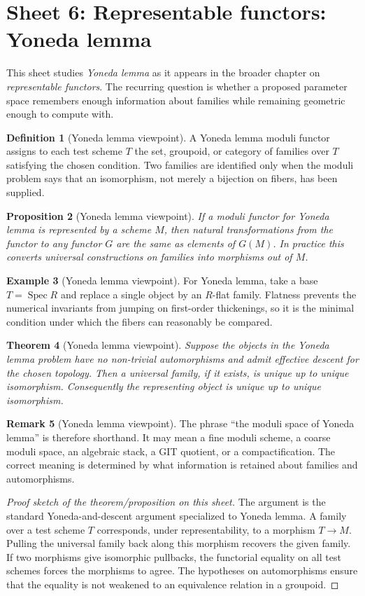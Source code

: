 \documentclass[11pt]{amsart}
\newtheorem{theorem}{Theorem}[section]
\newtheorem{proposition}[theorem]{Proposition}
\theoremstyle{definition}
\newtheorem{definition}[theorem]{Definition}
\newtheorem{example}[theorem]{Example}
\newtheorem{remark}[theorem]{Remark}
\newcommand{\Spec}{\operatorname{Spec}}
\begin{document}
\section{Sheet 6: Representable functors: Yoneda lemma}
This sheet studies \emph{Yoneda lemma} as it appears in the broader chapter on \emph{representable functors}.  The recurring question is whether a proposed parameter space remembers enough information about families while remaining geometric enough to compute with.
\begin{definition}[Yoneda lemma viewpoint]
A Yoneda lemma moduli functor assigns to each test scheme $T$ the set, groupoid, or category of families over $T$ satisfying the chosen condition.  Two families are identified only when the moduli problem says that an isomorphism, not merely a bijection on fibers, has been supplied.
\end{definition}
\begin{proposition}[Yoneda lemma viewpoint]
If a moduli functor for Yoneda lemma is represented by a scheme $M$, then natural transformations from the functor to any functor $G$ are the same as elements of $G(M)$.  In practice this converts universal constructions on families into morphisms out of $M$.
\end{proposition}
\begin{example}[Yoneda lemma viewpoint]
For Yoneda lemma, take a base $T=\Spec R$ and replace a single object by an $R$-flat family.  Flatness prevents the numerical invariants from jumping on first-order thickenings, so it is the minimal condition under which the fibers can reasonably be compared.
\end{example}
\begin{theorem}[Yoneda lemma viewpoint]
Suppose the objects in the Yoneda lemma problem have no non-trivial automorphisms and admit effective descent for the chosen topology.  Then a universal family, if it exists, is unique up to unique isomorphism.  Consequently the representing object is unique up to unique isomorphism.
\end{theorem}
\begin{remark}[Yoneda lemma viewpoint]
The phrase ``the moduli space of Yoneda lemma'' is therefore shorthand.  It may mean a fine moduli scheme, a coarse moduli space, an algebraic stack, a GIT quotient, or a compactification.  The correct meaning is determined by what information is retained about families and automorphisms.
\end{remark}
\begin{proof}[Proof sketch of the theorem/proposition on this sheet]
The argument is the standard Yoneda-and-descent argument specialized to Yoneda lemma.  A family over a test scheme $T$ corresponds, under representability, to a morphism $T\to M$.  Pulling the universal family back along this morphism recovers the given family.  If two morphisms give isomorphic pullbacks, the functorial equality on all test schemes forces the morphisms to agree.  The hypotheses on automorphisms ensure that the equality is not weakened to an equivalence relation in a groupoid.
\end{proof}
\end{document}
